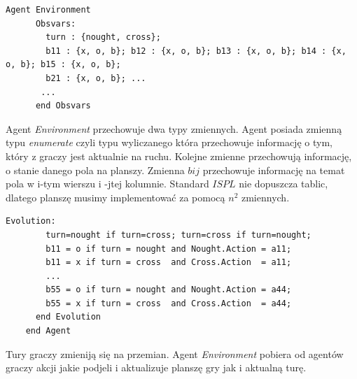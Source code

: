     \begin{lstlisting}[language={}]
    Agent Environment
      Obsvars:
        turn : {nought, cross};
        b11 : {x, o, b}; b12 : {x, o, b}; b13 : {x, o, b}; b14 : {x, o, b}; b15 : {x, o, b};
        b21 : {x, o, b}; ... 
       ...
      end Obsvars
    \end{lstlisting}
    Agent \textit{Environment} przechowuje dwa typy zmiennych. Agent posiada zmienną typu \textit{enumerate} czyli typu wyliczanego 
    która przechowuje informację o tym, który z graczy jest aktualnie na ruchu. Kolejne zmienne przechowują informację, o stanie 
    danego pola na planszy. Zmienna $bij$ przechowuje informację na temat pola w i-tym wierszu i -jtej kolumnie. Standard $ISPL$
    nie dopuszcza tablic, dlatego planszę musimy implementować za pomocą $n^{2}$ zmiennych. 
    \begin{lstlisting}[language={}]
      Evolution:
        turn=nought if turn=cross; turn=cross if turn=nought;
        b11 = o if turn = nought and Nought.Action = a11;
        b11 = x if turn = cross  and Cross.Action  = a11;
        ...
        b55 = o if turn = nought and Nought.Action = a44;
        b55 = x if turn = cross  and Cross.Action  = a44;
      end Evolution
    end Agent
     \end{lstlisting}
     Tury graczy zmieniją się na przemian. Agent \textit{Environment} pobiera od agentów graczy akcji jakie podjeli i aktualizuje 
     planszę gry jak i aktualną turę.
    
